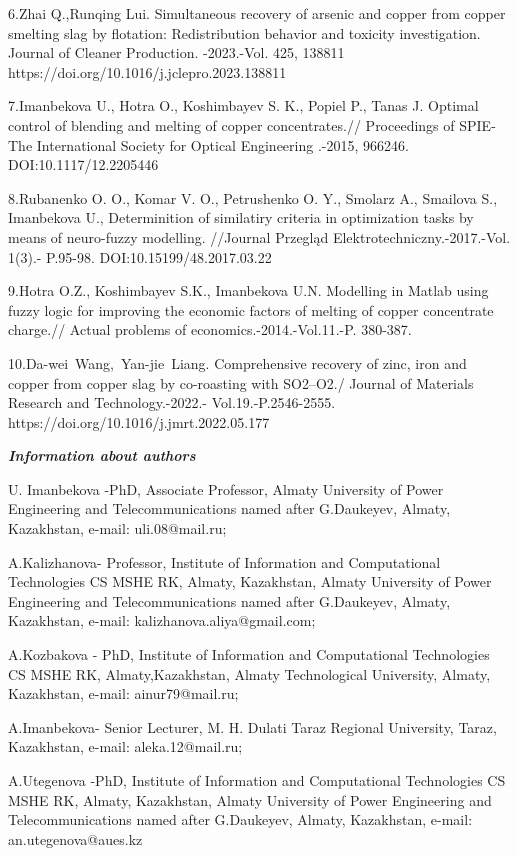 6.Zhai Q.,Runqing Lui. Simultaneous recovery of arsenic and copper from
copper smelting slag by flotation: Redistribution behavior and toxicity
investigation. Journal of Cleaner Production. -2023.-Vol. 425, 138811
https://doi.org/10.1016/j.jclepro.2023.138811

7.Imanbekova U., Hotra O., Koshimbayev S. K., Popiel P., Tanas J.
Optimal control of blending and melting of copper concentrates.//
Proceedings of SPIE-The International Society for Optical Engineering
.-2015, 966246. DOI:10.1117/12.2205446

8.Rubanenko O. O., Komar V. O., Petrushenko O. Y., Smolarz A., Smailova
S., Imanbekova U., Determinition of similatiry criteria in optimization
tasks by means of neuro-fuzzy modelling. //Journal Przegląd
Elektrotechniczny.-2017.-Vol. 1(3).- P.95-98. DOI:10.15199/48.2017.03.22

9.Hotra O.Z., Koshimbayev S.K., Imanbekova U.N. Modelling in Matlab
using fuzzy logic for improving the economic factors of melting of
copper concentrate charge.// Actual problems of
economics.-2014.-Vol.11.-P. 380-387.

10.Da-wei~Wang,~Yan-jie~Liang. Comprehensive recovery of zinc, iron and
copper from copper slag by co-roasting with SO2--O2./ Journal of
Materials Research and Technology.-2022.- Vol.19.-P.2546-2555.
https://doi.org/10.1016/j.jmrt.2022.05.177

\emph{\textbf{Information about authors}}

U. Imanbekova -PhD, Associate Professor, Almaty University of Power
Engineering and Telecommunications named after G.Daukeyev, Almaty,
Kazakhstan, e-mail: uli.08@mail.ru;

A.Kalizhanova- Professor, Institute of Information and Computational
Technologies CS MSHE RK, Almaty, Kazakhstan, Almaty University of Power
Engineering and Telecommunications named after G.Daukeyev, Almaty,
Kazakhstan, e-mail: kalizhanova.aliya@gmail.com;

A.Kozbakova - PhD, Institute of Information and Computational
Technologies CS MSHE RK, Almaty,Kazakhstan, Almaty Technological
University, Almaty, Kazakhstan, e-mail: ainur79@mail.ru;

A.Imanbekova- Senior Lecturer, M. H. Dulati Taraz Regional University,
Taraz, Kazakhstan, e-mail: aleka.12@mail.ru;

A.Utegenova -PhD, Institute of Information and Computational
Technologies CS MSHE RK, Almaty, Kazakhstan, Almaty University of Power
Engineering and Telecommunications named after G.Daukeyev, Almaty,
Kazakhstan, e-mail: an.utegenova@aues.kz

